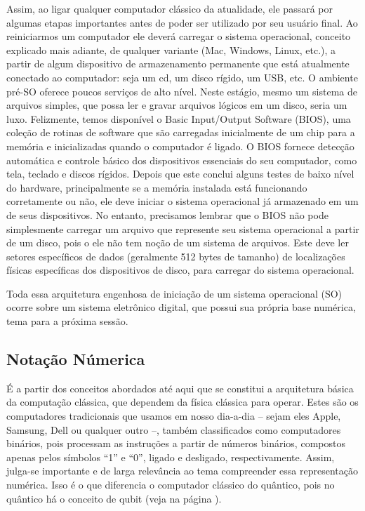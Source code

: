 Assim, ao ligar qualquer computador clássico da atualidade, ele passará por algumas etapas importantes antes de poder ser utilizado por seu usuário final. Ao reiniciarmos um computador ele deverá carregar o sistema operacional, conceito explicado mais adiante, de qualquer variante (Mac, Windows, Linux, etc.), a partir de algum dispositivo de armazenamento permanente que está atualmente conectado ao computador: seja um cd, um disco rígido, um USB, etc. O ambiente pré-SO oferece poucos serviços de alto nível. Neste estágio, mesmo um sistema de arquivos simples, que possa ler e gravar arquivos lógicos em um disco, seria um luxo. Felizmente, temos disponível o Basic Input/Output Software (BIOS), uma coleção de rotinas de software que são carregadas inicialmente de um chip para a memória e inicializadas quando o computador é ligado. O BIOS fornece detecção automática e controle básico dos dispositivos essenciais do seu computador, como tela, teclado e discos rígidos. Depois que este conclui alguns testes de baixo nível do hardware, principalmente se a memória instalada está funcionando corretamente ou não, ele deve iniciar o sistema operacional já armazenado em um de seus dispositivos. No entanto, precisamos lembrar que o BIOS não pode simplesmente carregar um arquivo que represente seu sistema operacional a partir de um disco, pois o ele não tem noção de um sistema de arquivos. Este deve ler setores específicos de dados (geralmente 512 bytes de tamanho) de localizações físicas específicas dos dispositivos de disco, para carregar do sistema operacional.

Toda essa arquitetura engenhosa de iniciação de um sistema operacional (SO) ocorre sobre um sistema eletrônico digital, que possui sua própria base numérica, tema para a próxima sessão.

\subsection{Notação Númerica}

É a partir dos conceitos abordados até aqui que se constitui a arquitetura básica da computação clássica, que dependem da física clássica para operar. Estes são os computadores tradicionais que usamos em nosso dia-a-dia – sejam eles Apple, Samsung, Dell ou qualquer outro –, também classificados como computadores binários, pois processam as instruções a partir de números binários, compostos apenas pelos símbolos ``1'' e ``0'', ligado e desligado, respectivamente. Assim, julga-se importante e de larga relevância ao tema compreender essa representação numérica. Isso é o que diferencia o computador clássico do quântico, pois no quântico há o conceito de qubit (veja na página \pageref{qubits}).

